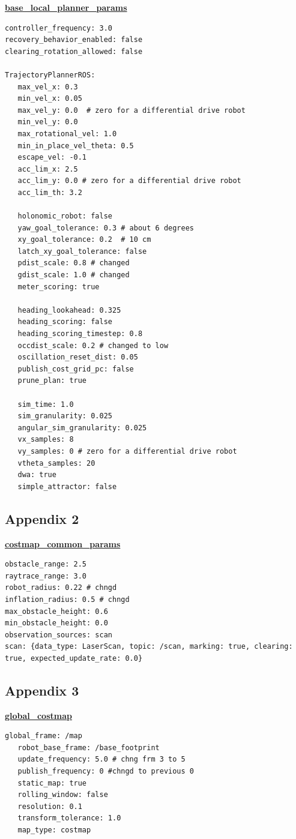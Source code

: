 \documentclass[10pt,a4paper]{article}
\begin{document}
\underline{\textbf{base\_local\_planner\_params}}
\begin{lstlisting}[frame=single]
controller_frequency: 3.0 
recovery_behavior_enabled: false 
clearing_rotation_allowed: false 

TrajectoryPlannerROS: 
   max_vel_x: 0.3 
   min_vel_x: 0.05 
   max_vel_y: 0.0  # zero for a differential drive robot 
   min_vel_y: 0.0 
   max_rotational_vel: 1.0 
   min_in_place_vel_theta: 0.5 
   escape_vel: -0.1 
   acc_lim_x: 2.5 
   acc_lim_y: 0.0 # zero for a differential drive robot 
   acc_lim_th: 3.2 

   holonomic_robot: false 
   yaw_goal_tolerance: 0.3 # about 6 degrees 
   xy_goal_tolerance: 0.2  # 10 cm 
   latch_xy_goal_tolerance: false 
   pdist_scale: 0.8 # changed 
   gdist_scale: 1.0 # changed 
   meter_scoring: true 

   heading_lookahead: 0.325 
   heading_scoring: false 
   heading_scoring_timestep: 0.8 
   occdist_scale: 0.2 # changed to low 
   oscillation_reset_dist: 0.05 
   publish_cost_grid_pc: false 
   prune_plan: true 

   sim_time: 1.0 
   sim_granularity: 0.025 
   angular_sim_granularity: 0.025 
   vx_samples: 8 
   vy_samples: 0 # zero for a differential drive robot 
   vtheta_samples: 20 
   dwa: true 
   simple_attractor: false
\end{lstlisting}
\newpage

\subsection{Appendix 2}

\underline{\textbf{costmap\_common\_params}}
\begin{lstlisting}[frame=single]
obstacle_range: 2.5 
raytrace_range: 3.0 
robot_radius: 0.22 # chngd 
inflation_radius: 0.5 # chngd 
max_obstacle_height: 0.6 
min_obstacle_height: 0.0 
observation_sources: scan 
scan: {data_type: LaserScan, topic: /scan, marking: true, clearing: true, expected_update_rate: 0.0}
\end{lstlisting}
\newpage

\subsection{Appendix 3}
\underline{\textbf{global\_costmap}}
\begin{lstlisting}[frame=single]
   global_frame: /map 
   robot_base_frame: /base_footprint 
   update_frequency: 5.0 # chng frm 3 to 5 
   publish_frequency: 0 #chngd to previous 0 
   static_map: true 
   rolling_window: false 
   resolution: 0.1 
   transform_tolerance: 1.0 
   map_type: costmap
\end{lstlisting}
\newpage
\end{document}
